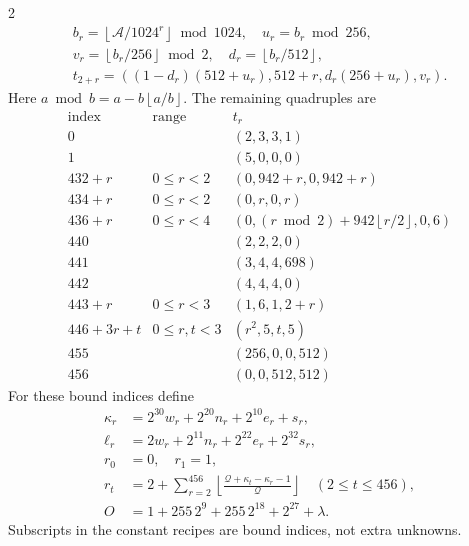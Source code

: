 \documentclass[10pt]{article}
\let\bigsum\sum
\renewcommand{\sum}{\bigsum\nolimits}
\newcommand{\fl}[1]{\left\lfloor #1\right\rfloor}
\begin{document}
\begin{multicols}{2}
\[\begin{gathered}
b_r=\fl{\mathcal A/1024^r}\bmod1024,\quad u_r=b_r\bmod256,\\
v_r=\fl{b_r/256}\bmod2,\quad d_r=\fl{b_r/512},\\
t_{2+r}=((1-d_r)(512+u_r),512+r,d_r(256+u_r),v_r).
\end{gathered}
\]
Here $a\bmod b=a-b\fl{a/b}$. The remaining quadruples are
\[
\begin{array}{c|c|l}
\text{index}&\text{range}&t_r\\\hline
0&& (2,3,3,1)\\
1&& (5,0,0,0)\\
432+r&0\le r<2&(0,942+r,0,942+r)\\
434+r&0\le r<2&(0,r,0,r)\\
436+r&0\le r<4&(0,(r\bmod2)+942\fl{r/2},0,6)\\
440&&(2,2,2,0)\\
441&&(3,4,4,698)\\
442&&(4,4,4,0)\\
443+r&0\le r<3&(1,6,1,2+r)\\
446+3r+t&0\le r,t<3&(r^2,5,t,5)\\
455&&(256,0,0,512)\\
456&&(0,0,512,512)
\end{array}
\]
For these bound indices define
\[
\begin{aligned}
\kappa_r&=2^{30}w_r+2^{20}n_r+2^{10}e_r+s_r,\\
\ell_r&=2w_r+2^{11}n_r+2^{22}e_r+2^{32}s_r,\\
r_0&=0,\quad r_1=1,\\
r_t&=2+\sum_{r=2}^{456}\fl{\frac{\mathcal Q+\kappa_t-\kappa_r-1}{\mathcal Q}}
 \quad(2\le t\le456),\\
O&=1+255\,2^9+255\,2^{18}+2^{27}+\lambda.
\end{aligned}
\]
Subscripts in the constant recipes are bound indices, not extra unknowns.


\end{multicols}
\end{document}
